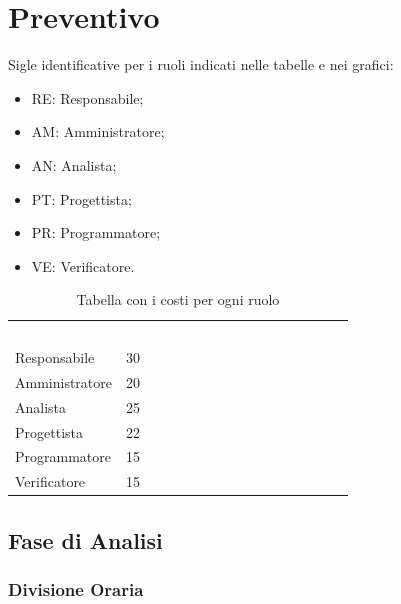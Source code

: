 \section{Preventivo}
Sigle identificative per i ruoli indicati nelle tabelle e nei grafici:
\begin{itemize}
    \item RE: Responsabile;
    \item AM: Amministratore;
    \item AN: Analista;
    \item PT: Progettista;
    \item PR: Programmatore;
    \item VE: Verificatore.
\end{itemize}
{
	
\renewcommand{\arraystretch}{2}

\centering

\begin{longtable}[h!]{ C{3cm} C{3cm}}
\caption{Tabella con i costi per ogni ruolo}\\
	\textcolor{white}{\textbf{Ruolo}} & 
	\textcolor{white}{\textbf{Costo per ora espresso in euro}}\\	
			
			Responsabile & 30\\
			Amministratore & 20\\
			Analista & 25\\
			Progettista & 22\\
			Programmatore & 15\\
			Verificatore & 15\\
			
		\end{longtable}
		

}

\clearpage
\subsection{Fase di Analisi}
\subsubsection{Divisione Oraria}

